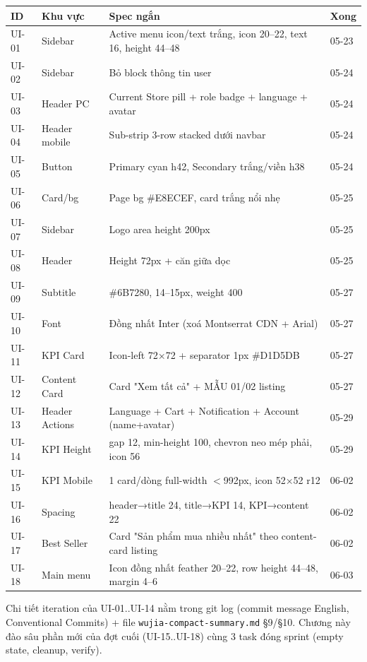 \begin{longtable}{@{}llp{6.8cm}l@{}}
\toprule
\textbf{ID} & \textbf{Khu vực} & \textbf{Spec ngắn} & \textbf{Xong} \\
\midrule
\endhead
UI-01 & Sidebar & Active menu icon/text trắng, icon 20--22, text 16, height 44--48 & 05-23 \\
UI-02 & Sidebar & Bỏ block thông tin user & 05-24 \\
UI-03 & Header PC & Current Store pill + role badge + language + avatar & 05-24 \\
UI-04 & Header mobile & Sub-strip 3-row stacked dưới navbar & 05-24 \\
UI-05 & Button & Primary cyan h42, Secondary trắng/viền h38 & 05-24 \\
UI-06 & Card/bg & Page bg \#E8ECEF, card trắng nổi nhẹ & 05-25 \\
UI-07 & Sidebar & Logo area height 200px & 05-25 \\
UI-08 & Header & Height 72px + căn giữa dọc & 05-25 \\
UI-09 & Subtitle & \#6B7280, 14--15px, weight 400 & 05-27 \\
UI-10 & Font & Đồng nhất Inter (xoá Montserrat CDN + Arial) & 05-27 \\
UI-11 & KPI Card & Icon-left 72×72 + separator 1px \#D1D5DB & 05-27 \\
UI-12 & Content Card & Card "Xem tất cả" + MẪU 01/02 listing & 05-27 \\
UI-13 & Header Actions & Language + Cart + Notification + Account (name+avatar) & 05-29 \\
UI-14 & KPI Height & gap 12, min-height 100, chevron neo mép phải, icon 56 & 05-29 \\
UI-15 & KPI Mobile & 1 card/dòng full-width \(<\)992px, icon 52×52 r12 & 06-02 \\
UI-16 & Spacing & header→title 24, title→KPI 14, KPI→content 22 & 06-02 \\
UI-17 & Best Seller & Card "Sản phẩm mua nhiều nhất" theo content-card listing & 06-02 \\
UI-18 & Main menu & Icon đồng nhất feather 20--22, row height 44--48, margin 4--6 & 06-03 \\
\bottomrule
\end{longtable}

Chi tiết iteration của UI-01..UI-14 nằm trong git log (commit message English,
Conventional Commits) + file \texttt{wujia-compact-summary.md} §9/§10. Chương này
đào sâu phần mới của đợt cuối (UI-15..UI-18) cùng 3 task đóng sprint
(empty state, cleanup, verify).

